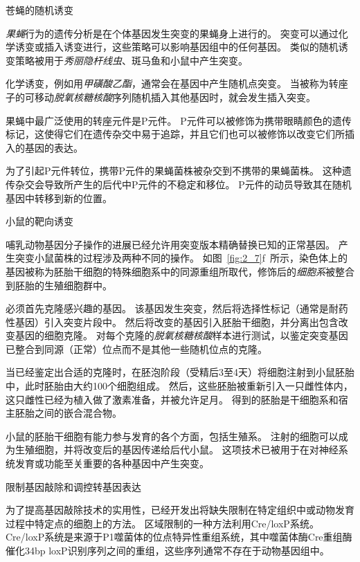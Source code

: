 \begin{proposition}[在实验动物中产生突变] \label{box:2_2}
	
	\quad \quad 苍蝇的随机诱变
	
	\quad \quad \textit{果蝇}行为的遗传分析是在个体基因发生突变的果蝇身上进行的。
	突变可以通过化学诱变或插入诱变进行，这些策略可以影响基因组中的任何基因。
	类似的随机诱变策略被用于\textit{秀丽隐杆线虫}、斑马鱼和小鼠中产生突变。
	
	\quad \quad 化学诱变，例如用\textit{甲磺酸乙酯}，通常会在基因中产生随机点突变。
	当被称为转座子的可移动\textit{脱氧核糖核酸}序列随机插入其他基因时，就会发生插入突变。
	
	\quad \quad 果蝇中最广泛使用的转座元件是P元件。
	P元件可以被修饰为携带眼睛颜色的遗传标记，这使得它们在遗传杂交中易于追踪，并且它们也可以被修饰以改变它们所插入的基因的表达。
	
	\quad \quad 为了引起P元件转位，携带P元件的果蝇菌株被杂交到不携带的果蝇菌株。
	这种遗传杂交会导致所产生的后代中P元件的不稳定和移位。
	P元件的动员导致其在随机基因中转移到新的位置。
	
	\quad \quad 小鼠的靶向诱变
	
	\quad \quad 哺乳动物基因分子操作的进展已经允许用突变版本精确替换已知的正常基因。
	产生突变小鼠菌株的过程涉及两种不同的操作。
	如图~\ref{fig:2_7}f~所示，染色体上的基因被称为胚胎干细胞的特殊细胞系中的同源重组所取代，修饰后的\textit{细胞系}被整合到胚胎的生殖细胞群中。
	
	\quad \quad 必须首先克隆感兴趣的基因。
	该基因发生突变，然后将选择性标记（通常是耐药性基因）引入突变片段中。
	然后将改变的基因引入胚胎干细胞，并分离出包含改变基因的细胞克隆。
	对每个克隆的\textit{脱氧核糖核酸}样本进行测试，以鉴定突变基因已整合到同源（正常）位点而不是其他一些随机位点的克隆。
	
	\quad \quad 当已经鉴定出合适的克隆时，在胚泡阶段（受精后3至4天）将细胞注射到小鼠胚胎中，此时胚胎由大约100个细胞组成。
	然后，这些胚胎被重新引入一只雌性体内，这只雌性已经为植入做了激素准备，并被允许足月。
	得到的胚胎是干细胞系和宿主胚胎之间的嵌合混合物。
	
	\quad \quad 小鼠的胚胎干细胞有能力参与发育的各个方面，包括生殖系。
	注射的细胞可以成为生殖细胞，并将改变后的基因传递给后代小鼠。
	这项技术已被用于在对神经系统发育或功能至关重要的各种基因中产生突变。
	
	\quad \quad 限制基因敲除和调控转基因表达
	
	\quad \quad 为了提高基因敲除技术的实用性，已经开发出将缺失限制在特定组织中或动物发育过程中特定点的细胞上的方法。
	区域限制的一种方法利用Cre/loxP系统。
	Cre/loxP系统是来源于P1噬菌体的位点特异性重组系统，其中噬菌体酶Cre重组酶催化34bp loxP识别序列之间的重组，这些序列通常不存在于动物基因组中。
	

\end{proposition}
